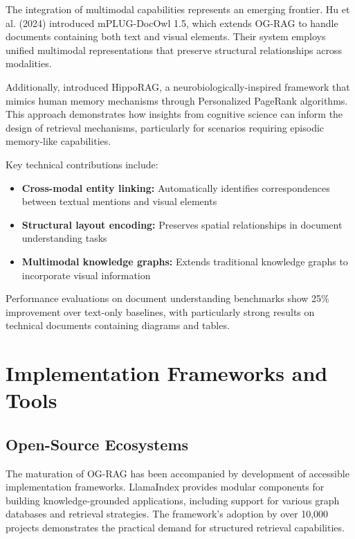 \documentclass[12pt]{report}
\begin{document}
The integration of multimodal capabilities represents an emerging frontier. Hu et al. (2024) introduced mPLUG-DocOwl 1.5, which extends OG-RAG to handle documents containing both text and visual elements. Their system employs unified multimodal representations that preserve structural relationships across modalities.

Additionally, \citet{jimenezgutierrezHipporagNeurobiologicallyInspired2024} introduced HippoRAG, a neurobiologically-inspired framework that mimics human memory mechanisms through Personalized PageRank algorithms. This approach demonstrates how insights from cognitive science can inform the design of retrieval mechanisms, particularly for scenarios requiring episodic memory-like capabilities.

Key technical contributions include:
\begin{itemize}
\item \textbf{Cross-modal entity linking:} Automatically identifies correspondences between textual mentions and visual elements
\item \textbf{Structural layout encoding:} Preserves spatial relationships in document understanding tasks
\item \textbf{Multimodal knowledge graphs:} Extends traditional knowledge graphs to incorporate visual information
\end{itemize}

Performance evaluations on document understanding benchmarks show 25\% improvement over text-only baselines, with particularly strong results on technical documents containing diagrams and tables.

\section{Implementation Frameworks and Tools}

\subsection{Open-Source Ecosystems}

The maturation of OG-RAG has been accompanied by development of accessible implementation frameworks. LlamaIndex \citep{BuildingDataFramework} provides modular components for building knowledge-grounded applications, including support for various graph databases and retrieval strategies. The framework's adoption by over 10,000 projects demonstrates the practical demand for structured retrieval capabilities.
\end{document}
